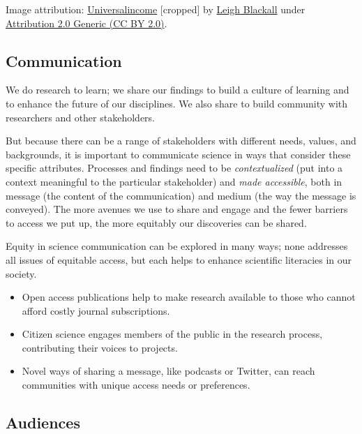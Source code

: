 \documentclass[
]{book}
\providecommand{\tightlist}{%
  \setlength{\itemsep}{0pt}\setlength{\parskip}{0pt}}
\begin{document}
Image attribution: \href{https://www.flickr.com/photos/leighblackall/30727349115/}{Universalincome} {[}cropped{]} by \href{https://www.flickr.com/photos/leighblackall/}{Leigh Blackall} under \href{https://creativecommons.org/licenses/by/2.0}{Attribution 2.0 Generic (CC BY 2.0)}.

\hypertarget{communication}{%
\subsection*{Communication}\label{communication}}

We do research to learn; we share our findings to build a culture of learning and to enhance the future of our disciplines. We also share to build community with researchers and other stakeholders.

But because there can be a range of stakeholders with different needs, values, and backgrounds, it is important to communicate science in ways that consider these specific attributes. Processes and findings need to be \emph{contextualized} (put into a context meaningful to the particular stakeholder) and \emph{made accessible}, both in message (the content of the communication) and medium (the way the message is conveyed). The more avenues we use to share and engage and the fewer barriers to access we put up, the more equitably our discoveries can be shared.

Equity in science communication can be explored in many ways; none addresses all issues of equitable access, but each helps to enhance scientific literacies in our society.

\begin{itemize}
\tightlist
\item
  Open access publications help to make research available to those who cannot afford costly journal subscriptions.
\item
  Citizen science engages members of the public in the research process, contributing their voices to projects.
\item
  Novel ways of sharing a message, like podcasts or Twitter, can reach communities with unique access needs or preferences.
\end{itemize}

\hypertarget{audiences}{%
\subsection*{Audiences}\label{audiences}}
\end{document}

